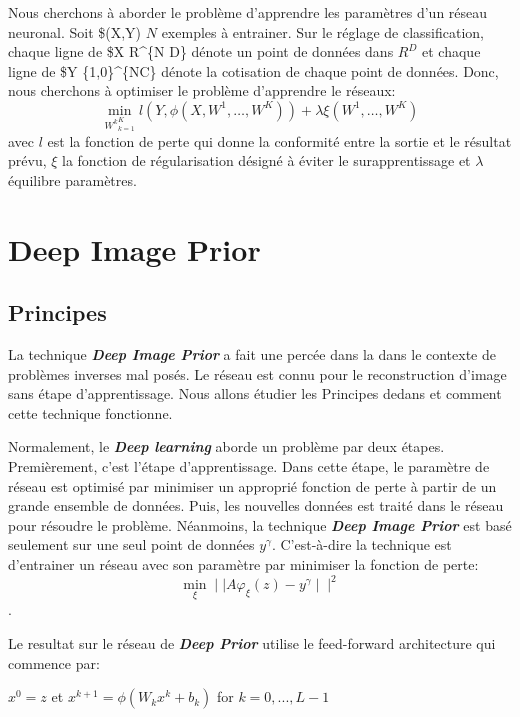 \documentclass[
  12pt,
  dvipsnames]{article}
\begin{document}
Nous cherchons à aborder le problème d'apprendre les paramètres d'un réseau neuronal. Soit \$(X,Y) \(N\) exemples à entrainer. Sur le réglage de classification, chaque ligne de \$X \in R\^{}\{N \cdot D\} dénote un point de données dans \(R^D\) et chaque ligne de \$Y \in \{1,0\}\^{}\{N\cdot C\} dénote la cotisation de chaque point de données. Donc, nous cherchons à optimiser le problème d'apprendre le réseaux:
\[\min_{{W^k}_{k=1}^K} l(Y,\phi(X,W^1,\dots,W^K))+\lambda \xi(W^1,\dots,W^K)\] avec \(l\) est la fonction de perte qui donne la conformité entre la sortie et le résultat prévu, \(\xi\) la fonction de régularisation désigné à éviter le surapprentissage et \(\lambda\) équilibre paramètres.

\newpage

\hypertarget{deep-image-prior}{%
\section{Deep Image Prior}\label{deep-image-prior}}

\hypertarget{principes}{%
\subsection{Principes}\label{principes}}

La technique \textbf{\emph{Deep Image Prior}} a fait une percée dans la dans le contexte
de problèmes inverses mal posés. Le réseau est connu pour le reconstruction d'image sans étape d'apprentissage. Nous allons étudier les Principes dedans et comment cette technique fonctionne.

Normalement, le \textbf{\emph{Deep learning}} aborde un problème par deux étapes. Premièrement, c'est l'étape d'apprentissage.
Dans cette étape, le paramètre de réseau est optimisé par minimiser un approprié fonction de perte à partir de
un grande ensemble de données. Puis, les nouvelles données est traité dans le réseau pour résoudre le problème.
Néanmoins, la technique \textbf{\emph{Deep Image Prior}} est basé seulement sur une seul point de données \(y^\gamma\). C'est-à-dire
la technique est d'entrainer un réseau avec son paramètre par minimiser la fonction de perte: \[\min_{\xi} \mid\mid A\varphi_\xi(z) - y^\gamma \mid\mid^2\].

Le resultat sur le réseau de \textbf{\emph{Deep Prior}} utilise le feed-forward architecture qui commence par:

\begin{center} $x^0 = z$    et    $x^{k+1} = \phi (W_k x^k + b_k)$ for $k = 0,...,L-1$  \end{center}
\end{document}
